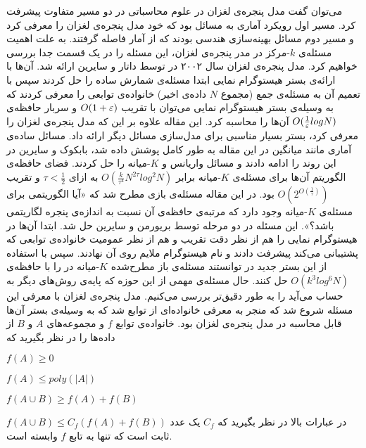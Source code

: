 می‌توان گفت مدل پنجره‌ی لغزان در علوم محاسباتی در دو مسیر متفاوت پیشرفت کرد. مسیر اول رویکرد آماری به مسائل بود که خود مدل پنجره‌ی لغزان را معرفی کرد و مسیر دوم مسائل بهینه‌سازی هندسی بودند که از آمار فاصله گرفتند. به علت اهمیت مسئله‌ی $k$-مرکز در مدر پنجره‌ی لغزان، این مسئله را در یک قسمت جدا بررسی خواهیم کرد.
مدل پنجره‌ی لغزان سال ۲۰۰۲ در 
توسط داتار و سایرین ارائه شد. آن‌ها با ارائه‌ی بستر هیستوگرام نمایی  ابتدا مسئله‌ی شمارش ساده را حل کردند سپس با تعمیم آن به مسئله‌ی جمع (مجموع $N$ داده‌ی اخیر) خانواده‌ی توابعی را معرفی کردند که به وسیله‌ی بستر هیستوگرام نمایی می‌توان با تقریب $O(1+\varepsilon)$ و سربار حافظه‌ی $O(\frac{1}{\varepsilon} log N)$ آن‌‌ها را محاسبه کرد. این مقاله علاوه بر این که مدل پنجره‌ی لغزان را معرفی کرد، بستر بسیار مناسبی برای مدل‌سازی مسائل دیگر ارائه داد. مسائل ساده‌ی آماری مانند میانگین در این مقاله به طور کامل پوشش داده شد، بابکوک و سایرین در  این روند را ادامه دادند و مسائل واریانس و $K$-میانه  را حل کردند. فضای حافظه‌ی الگوریتم آن‌ها برای مسئله‌ی $K$-میانه برابر
$O(\frac{k}{\tau^4}N^{2\tau} log^2 N)$
به ازای $ \tau < \frac{1}{2}$  و تقریب
$O(2^{O(\frac{1}{\tau})})$
بود. در این مقاله‌ مسئله‌ی بازی مطرح شد که «آیا الگوریتمی برای مسئله‌ی $K$-میانه وجود دارد که مرتبه‌ی حافظه‌ی آن نسبت به اندازه‌ی پنجره لگاریتمی باشد؟». این مسئله در دو مرحله توسط بریورمن و سایرین حل شد. ابتدا آن‌ها در 
  هیستوگرام نمایی را هم از نظر دقت تقریب و هم از نظر عمومیت خانواده‌ی توابعی که پشتیبانی می‌کند پیشرفت دادند و نام هیستوگرام ملایم  روی آن نهادند. سپس با استفاده از این بستر جدید در  
توانستند مسئله‌ی باز مطرح‌شده $K$-میانه در 
را با حافظه‌ی $ O(k^3 log^6 N)$ حل کنند.
حال مسئله‌ی مهمی از این حوزه که پایه‌ی روش‌های دیگر به حساب می‌آید را به طور دقیق‌تر بررسی می‌کنیم.
مدل پنجره‌ی لغزان با معرفی این مسئله شروع شد که منجر به معرفی خانواده‌ای از توابع شد که به وسیله‌ی بستر‌ آن‌ها قابل محاسبه در مدل پنجره‌ی لغزان بود. خانواده‌ی توابع $f$ و مجموعه‌های $A$ و $B$ از داده‌ها را در نظر بگیرید که

\item $f(A) \ge 0$
\item $f(A) \le poly(|A|)$
\item $f(A \cup B) \ge f(A) + f(B)$
\item $f(A \cup B) \le C_f (f(A) + f(B))$
در عبارات بالا در نظر بگیرید که $C_f$ یک عدد ثابت است که تنها به تابع $f$ وابسته است.

